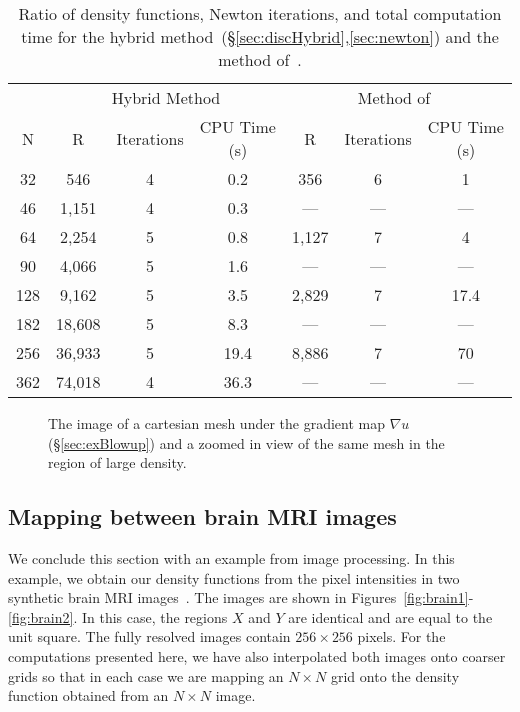 \documentclass{amsart}
\theoremstyle{lemma}
\theoremstyle{remark}
\begin{document}
\begin{table}[htdp]\small
\begin{center}
\begin{tabular}{ccccccc}
 & \multicolumn{3}{c}{Hybrid Method} & \multicolumn{3}{c}{Method of~\cite{Delzanno}}\\
N   & R & Iterations & CPU Time (s) & R & Iterations & CPU Time (s) \\
\hline
32  & 546 & 4& 0.2 & 356 & 6 & 1  \\
46  &  1,151 & 4 & 0.3 & --- & --- & --- \\
64  &  2,254 & 5 & 0.8 & 1,127 & 7 & 4 \\
90  &  4,066 & 5 & 1.6 & --- & --- & ---\\
128  & 9,162 & 5 & 3.5 & 2,829 & 7 & 17.4\\
182  & 18,608 & 5 & 8.3 & --- & --- & ---\\
256  & 36,933 & 5 & 19.4 & 8,886 & 7 & 70\\
362  & 74,018 & 4 & 36.3 & --- & --- & ---
\end{tabular}
\end{center}
\caption{Ratio of density functions, Newton iterations, and total computation time for the hybrid method~(\S\ref{sec:discHybrid},\ref{sec:newton}) and the method of~\cite{Delzanno}.}
\label{table:blowup}
\end{table}

\begin{figure}[htdp]
	\centering
  	\vspace*{-12pt}\caption{
  	 The image of a cartesian mesh under the gradient map $\nabla 	u$ (\S\ref{sec:exBlowup}) and  a zoomed in view of the same mesh in the region of large density. }
  	\label{fig:blowup}
\end{figure} 

\subsection{Mapping between brain MRI images}\label{sec:brains}
We conclude this section with an example from image processing.  In this example, we obtain our density functions from the pixel intensities in two synthetic brain MRI images~\cite{brainweb,CollinsBrains,CocoscoBrains}.  The images are shown in Figures~\ref{fig:brain1}-\ref{fig:brain2}.  In this case, the regions $X$ and $Y$ are identical and are equal to the unit square.  The fully resolved images contain $256\times256$ pixels.  For the computations presented here, we have also interpolated both images onto coarser grids so that in each case we are mapping an $N\times N$ grid onto the density function obtained from an $N\times N$ image.  
\end{document}

